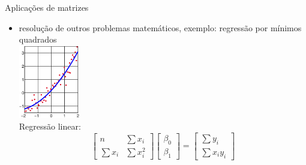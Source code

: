 \documentclass[portuguese,10pt,xcolor=table]{bredelebeamer}
\begin{document}
	\begin{frame}{Aplicações de matrizes}
		\begin{itemize}
			\item resolução de outros problemas matemáticos, exemplo: regressão por mínimos quadrados\\
				\includegraphics[height=3.2cm]{fitting.png}\\
				Regressão linear: $$
				\begin{bmatrix}
					n & \sum x_i \\
					\sum x_i & \sum x_i^2
				\end{bmatrix}
				\begin{bmatrix}
					\beta_0 \\
					\beta_1 
				\end{bmatrix}
				= 
				\begin{bmatrix}
					\sum y_i\\
					\sum x_i y_i
				\end{bmatrix}
				$$
		\end{itemize}
	\end{frame}
\end{document}
